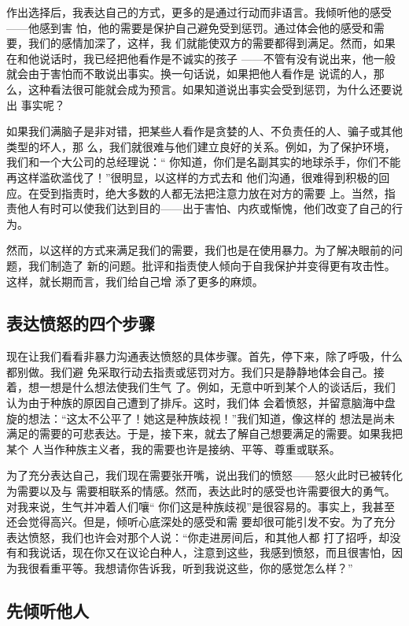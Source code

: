 \documentclass{ctexart}
\begin{document}
作出选择后，我表达自己的方式，更多的是通过行动而非语言。我倾听他的感受------他感到害
怕，他的需要是保护自己避免受到惩罚。通过体会他的感受和需要，我们的感情加深了，这样，我
们就能使双方的需要都得到满足。然而，如果在和他说话时，我已经把他看作是不诚实的孩子
------不管有没有说出来，他一般就会由于害怕而不敢说出事实。换一句话说，如果把他人看作是
说谎的人，那么，这种看法很可能就会成为预言。如果知道说出事实会受到惩罚，为什么还要说出
事实呢？

如果我们满脑子是非对错，把某些人看作是贪婪的人、不负责任的人、骗子或其他类型的坏人，那
么，我们就很难与他们建立良好的关系。例如，为了保护环境，我们和一个大公司的总经理说：``
你知道，你们是名副其实的地球杀手，你们不能再这样滥砍滥伐了！''很明显，以这样的方式去和
他们沟通，很难得到积极的回应。在受到指责时，绝大多数的人都无法把注意力放在对方的需要
上。当然，指责他人有时可以使我们达到目的------出于害怕、内疚或惭愧，他们改变了自己的行
为。

然而，以这样的方式来满足我们的需要，我们也是在使用暴力。为了解决眼前的问题，我们制造了
新的问题。批评和指责使人倾向于自我保护并变得更有攻击性。这样，就长期而言，我们给自己增
添了更多的麻烦。


\subsection{表达愤怒的四个步骤}

现在让我们看看非暴力沟通表达愤怒的具体步骤。首先，停下来，除了呼吸，什么都别做。我们避
免采取行动去指责或惩罚对方。我们只是静静地体会自己。接着，想一想是什么想法使我们生气
了。例如，无意中听到某个人的谈话后，我们认为由于种族的原因自己遭到了排斥。这时，我们体
会着愤怒，并留意脑海中盘旋的想法：``这太不公平了！她这是种族歧视！''我们知道，像这样的
想法是尚未满足的需要的可悲表达。于是，接下来，就去了解自己想要满足的需要。如果我把某个
人当作种族主义者，我的需要也许是接纳、平等、尊重或联系。

为了充分表达自己，我们现在需要张开嘴，说出我们的愤怒------怒火此时已被转化为需要以及与
需要相联系的情感。然而，表达此时的感受也许需要很大的勇气。对我来说，生气并冲着人们嚷``
你们这是种族歧视''是很容易的。事实上，我甚至还会觉得高兴。但是，倾听心底深处的感受和需
要却很可能引发不安。为了充分表达愤怒，我们也许会对那个人说：``你走进房间后，和其他人都
打了招呼，却没有和我说话，现在你又在议论白种人，注意到这些，我感到愤怒，而且很害怕，因
为我很看重平等。我想请你告诉我，听到我说这些，你的感觉怎么样？''

\subsection{先倾听他人}
\end{document}
